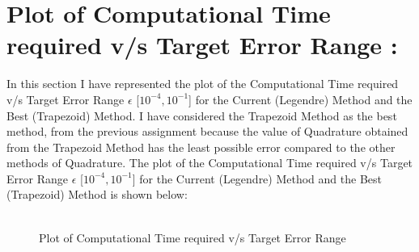 \documentclass[12pt,a4paper]{article}
\begin{document}
\section{Plot of  Computational Time required v/s Target Error Range :}
In this section I have represented the plot of the Computational Time required v/s Target Error Range $\epsilon$ [$10^{-4}, 10^{-1}$] for the Current (Legendre) Method and the Best (Trapezoid) Method. I have considered the Trapezoid Method as the best method, from the previous assignment because the value of Quadrature obtained from the Trapezoid Method has the least possible error compared to the other methods of Quadrature. The plot of the Computational Time required v/s Target Error Range $\epsilon$ [$10^{-4}, 10^{-1}$] for the Current (Legendre) Method and the Best (Trapezoid) Method is shown below:
\\ \\
\begin{figure}[!ht]
	\begin{center}
	\end{center}
	\caption{Plot of Computational Time required v/s Target Error Range}
\end{figure}
\end{document}
